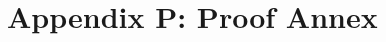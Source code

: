 \documentclass[11pt]{book}
\begin{document}
\frontmatter

\tableofcontents
\mainmatter

\hbannexsetup
\part*{Appendix P: Proof Annex}

\backmatter
\printbibliography
\printindex
\end{document}
